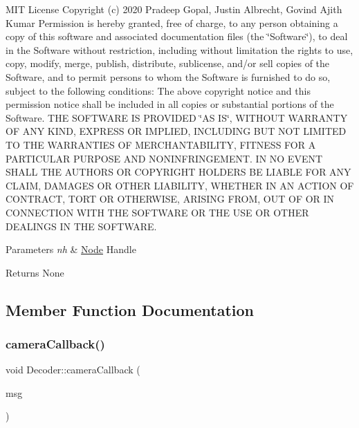 M\+IT License Copyright (c) 2020 Pradeep Gopal, Justin Albrecht, Govind Ajith Kumar Permission is hereby granted, free of charge, to any person obtaining a copy of this software and associated documentation files (the \char`\"{}\+Software\char`\"{}), to deal in the Software without restriction, including without limitation the rights to use, copy, modify, merge, publish, distribute, sublicense, and/or sell copies of the Software, and to permit persons to whom the Software is furnished to do so, subject to the following conditions\+: The above copyright notice and this permission notice shall be included in all copies or substantial portions of the Software. T\+HE S\+O\+F\+T\+W\+A\+RE IS P\+R\+O\+V\+I\+D\+ED \char`\"{}\+A\+S I\+S\char`\"{}, W\+I\+T\+H\+O\+UT W\+A\+R\+R\+A\+N\+TY OF A\+NY K\+I\+ND, E\+X\+P\+R\+E\+SS OR I\+M\+P\+L\+I\+ED, I\+N\+C\+L\+U\+D\+I\+NG B\+UT N\+OT L\+I\+M\+I\+T\+ED TO T\+HE W\+A\+R\+R\+A\+N\+T\+I\+ES OF M\+E\+R\+C\+H\+A\+N\+T\+A\+B\+I\+L\+I\+TY, F\+I\+T\+N\+E\+SS F\+OR A P\+A\+R\+T\+I\+C\+U\+L\+AR P\+U\+R\+P\+O\+SE A\+ND N\+O\+N\+I\+N\+F\+R\+I\+N\+G\+E\+M\+E\+NT. IN NO E\+V\+E\+NT S\+H\+A\+LL T\+HE A\+U\+T\+H\+O\+RS OR C\+O\+P\+Y\+R\+I\+G\+HT H\+O\+L\+D\+E\+RS BE L\+I\+A\+B\+LE F\+OR A\+NY C\+L\+A\+IM, D\+A\+M\+A\+G\+ES OR O\+T\+H\+ER L\+I\+A\+B\+I\+L\+I\+TY, W\+H\+E\+T\+H\+ER IN AN A\+C\+T\+I\+ON OF C\+O\+N\+T\+R\+A\+CT, T\+O\+RT OR O\+T\+H\+E\+R\+W\+I\+SE, A\+R\+I\+S\+I\+NG F\+R\+OM, O\+UT OF OR IN C\+O\+N\+N\+E\+C\+T\+I\+ON W\+I\+TH T\+HE S\+O\+F\+T\+W\+A\+RE OR T\+HE U\+SE OR O\+T\+H\+ER D\+E\+A\+L\+I\+N\+GS IN T\+HE S\+O\+F\+T\+W\+A\+RE. 
\begin{DoxyParams}{Parameters}
{\em nh} & \hyperlink{class_node}{Node} Handle \\
\hline
\end{DoxyParams}
\begin{DoxyReturn}{Returns}
None 
\end{DoxyReturn}


\subsection{Member Function Documentation}
\mbox{\label{class_decoder_ad1a01f7987bb122964af9ca6464189b5}} 
\subsubsection{\texorpdfstring{camera\+Callback()}{cameraCallback()}}
{\footnotesize\ttfamily void Decoder\+::camera\+Callback (\begin{DoxyParamCaption}\item[{const sensor\+\_\+msgs\+::\+Image\+Const\+Ptr \&}]{msg }\end{DoxyParamCaption})}



